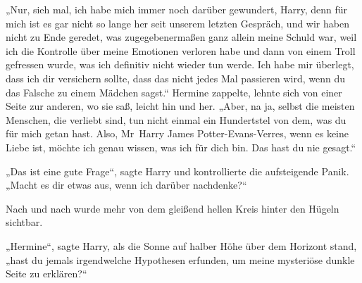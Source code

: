 „Nur, sieh mal, ich habe mich immer noch darüber gewundert, Harry, denn für mich ist es gar nicht so lange her seit unserem letzten Gespräch, und wir haben nicht zu Ende geredet, was zugegebenermaßen ganz allein meine Schuld war, weil ich die Kontrolle über meine Emotionen verloren habe und dann von einem Troll gefressen wurde, was ich definitiv nicht wieder tun werde. Ich habe mir überlegt, dass ich dir versichern sollte, dass das nicht jedes Mal passieren wird, wenn du das Falsche zu einem Mädchen sagst.“ Hermine zappelte, lehnte sich von einer Seite zur anderen, wo sie saß, leicht hin und her.
„Aber, na ja, selbst die meisten Menschen, die verliebt sind, tun nicht einmal ein Hundertstel von dem, was du für mich getan hast. Also, Mr~Harry James Potter-Evans-Verres, wenn es keine Liebe ist, möchte ich genau wissen, was ich für dich bin. Das hast du nie gesagt.“

„Das ist eine gute Frage“, sagte Harry und kontrollierte die aufsteigende Panik.
„Macht es dir etwas aus, wenn ich darüber nachdenke?“

Nach und nach wurde mehr von dem gleißend hellen Kreis hinter den Hügeln sichtbar.

„Hermine“, sagte Harry, als die Sonne auf halber Höhe über dem Horizont stand,
„hast du jemals irgendwelche Hypothesen erfunden, um meine mysteriöse dunkle Seite zu erklären?“


